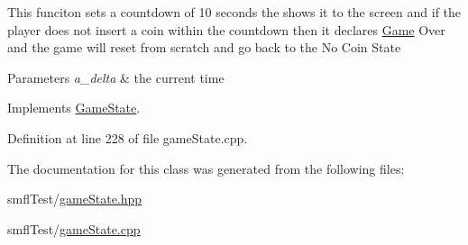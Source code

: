 This funciton sets a countdown of 10 seconds the shows it to the screen and if the player does not insert a coin within the countdown then it declares \hyperlink{class_game}{Game} Over and the game will reset from scratch and go back to the No Coin State


\begin{DoxyParams}{Parameters}
{\em a\+\_\+delta} & the current time \\
\hline
\end{DoxyParams}


Implements \hyperlink{class_game_state_ab1fe4312f7ce88e7dc11f9935dee67d1}{Game\+State}.



Definition at line 228 of file game\+State.\+cpp.



The documentation for this class was generated from the following files\+:\begin{DoxyCompactItemize}
\item 
smfl\+Test/\hyperlink{game_state_8hpp}{game\+State.\+hpp}\item 
smfl\+Test/\hyperlink{game_state_8cpp}{game\+State.\+cpp}\end{DoxyCompactItemize}
